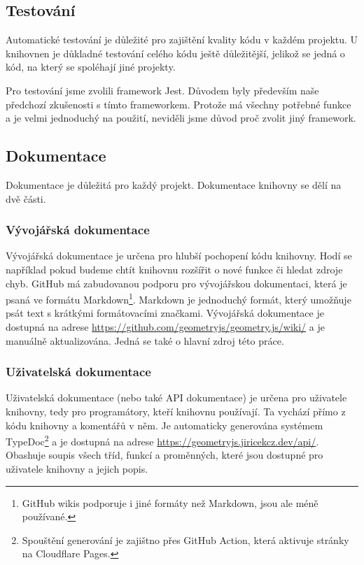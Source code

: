 \subsection{Testování}
\label{subsec:testing}

Automatické testování je důležité pro zajištění kvality kódu v každém projektu. 
U knihovnen je důkladné testování celého kódu ještě důležitější, jelikož se jedná o kód, na který se spoléhají jiné projekty.

Pro testování jsme zvolili framework Jest.
Důvodem byly především naše předchozí zkušenosti s tímto frameworkem.
Protože má všechny potřebné funkce a je velmi jednoduchý na použití, neviděli jsme důvod proč zvolit jiný framework.

\subsection{Dokumentace}
\label{subsec:documentation}

Dokumentace je důležitá pro každý projekt.
Dokumentace knihovny se dělí na dvě části.

\subsubsection{Vývojářská dokumentace}
\label{subsubsec:developer-documentation}

Vývojářská dokumentace je určena pro hlubší pochopení kódu knihovny.
Hodí se například pokud budeme chtít knihovnu rozšířit o nové funkce či hledat zdroje chyb.
GitHub má zabudovanou podporu pro vývojářskou dokumentaci\cite{GitHub:wikis}, která je psaná ve formátu Markdown\footnote{GitHub wikis podporuje i jiné formáty než Markdown, jsou ale méně používané.}.
Markdown je jednoduchý formát, který umožňuje psát text s krátkými formátovacími značkami\cite{GitHub:markdown}.
Vývojářská dokumentace je dostupná na adrese \url{https://github.com/geometryjs/geometry.js/wiki/} a je manuálně aktualizována. 
Jedná se také o hlavní zdroj této práce.

\subsubsection{Uživatelská dokumentace}
\label{subsubsec:user-documentation}

Uživatelská dokumentace (nebo také API dokumentace) je určena pro uživatele knihovny, tedy pro programátory, kteří knihovnu používají.
Ta vychází přímo z kódu knihovny a komentářů v něm.
Je automaticky generována systémem TypeDoc\footnote{Spouštění generování je zajištno přes GitHub Action, která aktivuje  stránky na Cloudflare Pages\cite{geometryjs:wiki:api}.} a je dostupná na adrese \url{https://geometryjs.jiricekcz.dev/api/}.
Obashuje soupis všech tříd, funkcí a proměnných, které jsou dostupné pro uživatele knihovny a jejich popis.